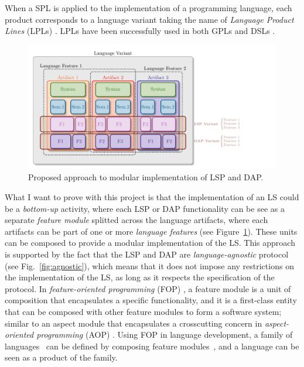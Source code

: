 When a SPL is applied to the implementation of a programming language, each product corresponds to a language variant \cite{Cazzola15f} taking the name of \textit{Language Product Lines} (LPLs) \cite{Cazzola15f}. LPLs have been successfully used in both GPLs \cite{Cazzola16, Cazzola16i, Cazzola15f} and DSLs \cite{Haugen08, Cazzola14e, White09}.
\hfill \break
\begin{figure}[t]
    \centering
    \includegraphics[width=1\linewidth]{figs/module_with_lsp.pdf}
    \caption{Proposed approach to modular implementation of LSP and DAP.}
    \label{fig:proposed}
\end{figure}
What I want to prove with this project is that the implementation of an LS could be a \textit{bottom-up} activity, where each LSP or DAP functionality can be see as a separate \textit{feature module} \cite{Batory04, Kastner11} splitted across the language artifacts, where each artifacts can be part of one or more \textit{language features} (see Figure~\ref{fig:proposed}). These units can be composed to provide a modular implementation of the LS. This approach is supported by the fact that the LSP and DAP are \textit{language-agnostic} protocol \cite{Niephaus20, Rodriguez-Echeverria18} (see Fig.~\ref{fig:agnostic}), which means that it does not impose any restrictions on the implementation of the LS, as long as it respects the specification of the protocol.
In \textit{feature-oriented programming} (FOP) \cite{Apel13, Czarnecki04, Prehofer01}, a feature module is a unit of composition that encapsulates a specific functionality, and it is a first-class entity that can be composed with other feature modules to form a software system; similar to an aspect module that encapsulates a crosscutting concern in \textit{aspect-oriented programming} (AOP) \cite{Kiczales01, Kiczales97, Laddad03}. Using FOP in language development, a family of languages~\cite{Liebig13} can be defined by composing feature modules~\cite{Wende09}, and a language can be seen as a product of the family.
